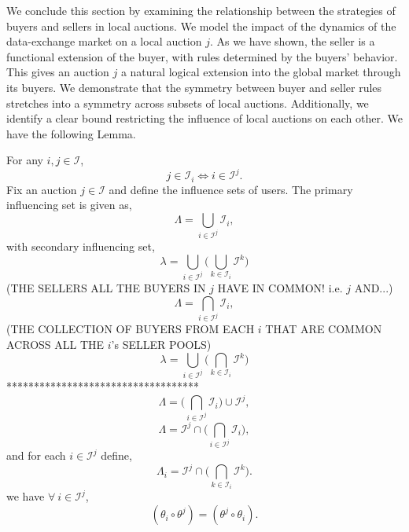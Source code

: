 \documentclass[12pt]{article}
\theoremstyle{definition}
\newcommand{\mcI}{\mathcal{I}}
\begin{document}
\begin{multicols}{2}
We conclude this section by examining the relationship between the strategies of buyers and
sellers in local auctions. We model the impact of the dynamics of the
data-exchange market on a local auction $j$. As we have shown, the seller
is a functional extension of the buyer, with rules determined by the buyers'
behavior. This gives an auction $j$ a natural logical extension into the
global market through its buyers. We demonstrate that the symmetry between
buyer and seller rules stretches into a symmetry across subsets of local
auctions. Additionally, we identify a clear bound restricting the influence of
local auctions on each other. We have the following Lemma.
\newpage
{
\label{userunion}
For any $i,j\in \mcI$, 
\begin{equation}\label{jtoi}
j\in\mcI_i \Leftrightarrow i\in\mcI^j.
\end{equation}
Fix an auction $j\in\mcI$ and define the influence sets of users. 
The primary influencing set is given as,
\begin{equation}\label{lambda}
    \Lambda = \displaystyle\bigcup_{i\in\mcI^j} \mcI_i,
\end{equation}
with secondary influencing set,
\begin{equation}\label{llambda}
    \lambda = \bigcup_{i\in\mcI^j} \bigg(\bigcup_{k\in\mcI_i} \mcI^k \bigg)
\end{equation}
\iffalse 
(THE SELLERS ALL THE BUYERS IN $j$ HAVE IN COMMON! i.e. $j$ AND...)
\begin{equation}%
    \Lambda = \displaystyle\bigcap_{i\in\mcI^j} \mcI_i,
\end{equation}
(THE COLLECTION OF BUYERS FROM EACH $i$ THAT ARE COMMON ACROSS ALL THE $i$'s SELLER
POOLS)
\begin{equation}%
    \lambda = \bigcup_{i\in\mcI^j} \bigg(\bigcap_{k\in\mcI_i} \mcI^k \bigg)
\end{equation}
***********************************
\begin{equation}
    \Lambda = \bigg(\displaystyle\bigcap_{i\in\mcI^j} \mcI_i \bigg) \cup \mcI^j,
\end{equation}
\begin{equation}
    \Lambda = \mcI^j \cap \bigg(\displaystyle\bigcap_{i\in\mcI^j} \mcI_i \bigg),
\end{equation}
and for each $i\in\mcI^j$ define,
\begin{equation}
    \Lambda_i = \mcI^j \cap \bigg(\displaystyle\bigcap_{k\in\mcI_i} \mcI^k
\bigg).
\end{equation}
we have $\forall \ i \in
\mcI^j$,
\begin{equation}\label{sym}
    (\theta_i \circ \theta^j) = (\theta^j \circ \theta_i).
\end{equation}

}
\end{multicols}
\end{document}
